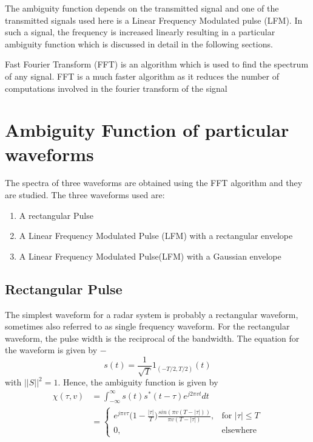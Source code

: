 \noindent The ambiguity function depends on the transmitted signal and one of the transmitted signals used here is a Linear Frequency Modulated pulse (LFM). In such a signal, the frequency is increased linearly resulting in a particular ambiguity function which is discussed in detail in the following sections.

\noindent Fast Fourier Transform (FFT) is an algorithm which is used to find the spectrum of any signal. FFT is a much faster algorithm as it reduces the number of computations involved in the fourier transform of the signal
\newpage
\section*{ Ambiguity Function of particular waveforms } 
\noindent The spectra of three waveforms are obtained using the FFT algorithm and they are studied. The three waveforms used are:
\begin{enumerate}
  \item A rectangular Pulse
  \item A Linear Frequency Modulated Pulse (LFM) with a rectangular envelope
  \item A Linear Frequency Modulated Pulse(LFM) with a Gaussian envelope
\end{enumerate}

\subsection*{ Rectangular Pulse } 
\noindent The simplest waveform for a radar system is probably a rectangular waveform, sometimes also referred to as single frequency waveform. For the rectangular waveform, the pulse width is the reciprocal of the bandwidth. The equation for the waveform is given by $-$
\begin{equation}
 s(t) = \frac{1}{\sqrt{T}}1_{(-T/2,T/2)}(t)
 \end{equation}
 \noindent with $||S||^{2} = 1$. Hence, the ambiguity function is given by
 \begin{equation} \label{eq4}
\begin{split}
\chi(\tau,v) & = \int_{-\infty}^{\infty} s(t) s^{*}(t-\tau) e^{j2\pi vt}dt \\
& =  \begin{cases} e^{j\pi v \tau} \Big( 1 - \frac{|\tau|}{T} \Big) \frac{sin(\pi v(T - |\tau|))}{\pi v(T - |\tau|)}, & \mbox{for $|\tau| \leq T$} \\ 0, & \mbox{elsewhere} \end{cases} \\
\end{split}
\end{equation}

